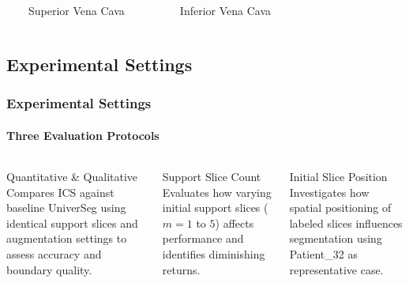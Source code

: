 \documentclass[nometaot,lecture,amberg,toc=twocolumn,indicatelastpageofframe,footlinebox]{OTHAWbeamer}
\begin{document}
\begin{frame}
{\begin{columns}[c]
            \vspace{0.4em}

            \begin{columns}[c]
                    {\small\textcolor{lila1}{\rule{0.7em}{0.7em}}~Superior Vena Cava}\\[0.4em]
                    {\small\textcolor[rgb]{0.9,0.8,0.05}{\rule{0.7em}{0.7em}}~Inferior Vena Cava}
            \end{columns}

    \end{columns}}

\end{frame}

\subsection{Experimental Settings}
\begin{frame}[label=expsettings]
    \frametitle{Experimental Settings}
    \framesubtitle{Three Evaluation Protocols}

    \begin{columns}[T]

            \begin{block}{Quantitative \& Qualitative}
                Compares ICS against baseline UniverSeg using identical support
                slices and augmentation settings to assess accuracy and boundary quality.
            \end{block}


            \begin{block}{Support Slice Count}
                Evaluates how varying initial support slices ($m = 1$ to $5$)
                affects performance and identifies diminishing returns.
            \end{block}


            \begin{block}{Initial Slice Position}
                Investigates how spatial positioning of labeled slices influences
                segmentation using Patient\_32 as representative case.
            \end{block}

    \end{columns}

\end{frame}
\end{document}
